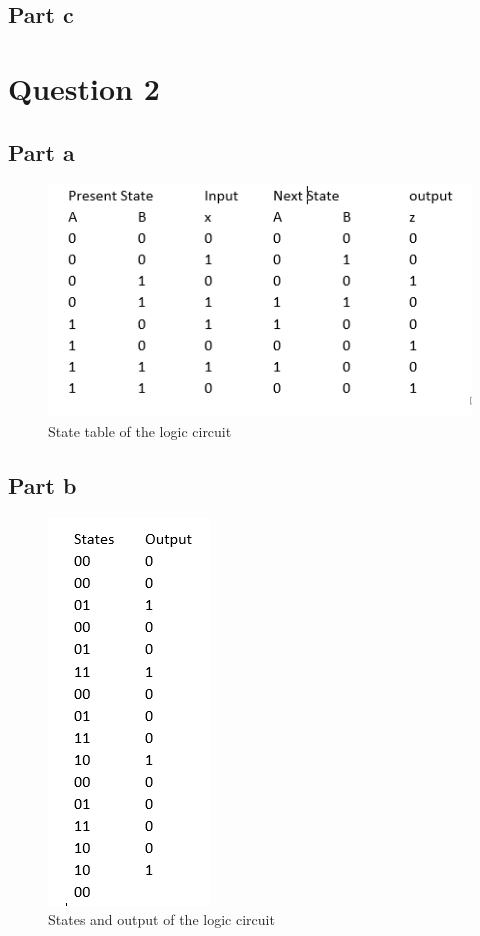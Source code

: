\documentclass[11 pt]{article}
\begin{document}
\subsection*{Part c}
\newpage

\section*{Question 2}
\subsection*{Part a}
\begin{figure}[H]
\centering
  \includegraphics[scale=0.7]{q2}
  \caption{State table of the logic circuit}
  \label{fig:zero}
\end{figure}

\subsection*{Part b}
\begin{figure}[H]
\centering
  \includegraphics[scale=0.7]{q2_'}
  \caption{States and output of the logic circuit}
  \label{fig:zero}
\end{figure}
\end{document}
